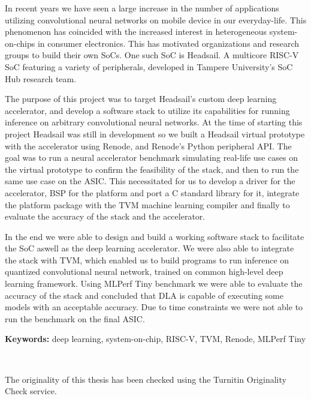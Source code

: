\documentclass[12pt,a4paper,english
]{tunithesis}
\begin{document}
\vspace{0.5cm}


\noindent In recent years we have seen a large increase in the number of applications utilizing convolutional neural networks on mobile device in our everyday-life. This phenomenon has coincided with the increased interest in heterogeneous system-on-chips in consumer electronics. This has motivated organizations and research groups to build their own SoCs. One such SoC is Headsail. A multicore RISC-V SoC featuring a variety of peripherals, developed in Tampere University's SoC Hub research team.

The purpose of this project was to target Headsail's custom deep learning accelerator, and develop a software stack to utilize its capabilities for running inference on arbitrary convolutional neural networks. At the time of starting this project Headsail was still in development so we built a Headsail virtual prototype with the accelerator using Renode, and Renode's Python peripheral API. The goal was to run a neural accelerator benchmark simulating real-life use cases on the virtual prototype to confirm the feasibility of the stack, and then to run the same use case on the ASIC.
This necessitated for us to develop a driver for the accelerator, BSP for the platform and port a C standard library for it, integrate the platform package with the TVM machine learning compiler and finally to evaluate the accuracy of the stack and the accelerator.

In the end we were able to design and build a working software stack to facilitate the SoC aswell as the deep learning accelerator. We were also able to integrate the stack with TVM, which enabled us to build programs to run inference on quantized convolutional neural network, trained on common high-level deep learning framework. Using MLPerf Tiny benchmark we were able to evaluate the accuracy of the stack and concluded that DLA is capable of executing some models with an acceptable accuracy. Due to time constraints we were not able to run the benchmark on the final ASIC.

\noindent\textbf{Keywords:} deep learning, system-on-chip, RISC-V, TVM, Renode, MLPerf Tiny

~

\noindent The originality of this thesis has been checked using the Turnitin Originality Check service.
\end{document}
